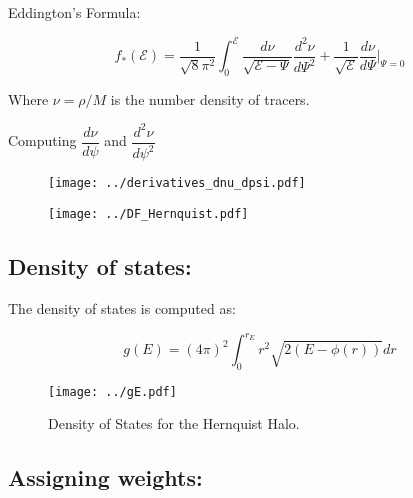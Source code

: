 \documentclass[14pt]{article}
\begin{document}
Eddington's Formula: 

\begin{equation}
  f_*(\mathcal{E}) = \dfrac{1}{\sqrt{8}\pi^2}\int_0^{\mathcal{E}} \dfrac{d
  \nu}{\sqrt{\mathcal{E}- \Psi}}  \dfrac{d^2 \nu}{d \Psi^2} +
  \dfrac{1}{\sqrt{\mathcal{E}}}\dfrac{d \nu}{d\Psi} \vert _{\Psi=0} 
\end{equation}

Where $\nu=\rho/M$ is the number density of tracers.

Computing $\dfrac{d \nu}{d \psi}$ and $\dfrac{d^2 \nu}{d \psi^2}$


\begin{figure}[H]
  \centering
  \texttt{[image: ../derivatives\_dnu\_dpsi.pdf]}
\end{figure}

\begin{figure}[H]
  \centering
  \texttt{[image: ../DF\_Hernquist.pdf]}
\end{figure}


\subsection{Density of states:}


The density of states is computed as:

\begin{equation}
  g(E) = (4\pi)^2 \int_0^{r_E} r^2 \sqrt{2(E - \phi(r))} dr
\end{equation}


\begin{figure}[H]
  \centering
  \texttt{[image: ../gE.pdf]}
  \caption{Density of States for the Hernquist Halo.}
\end{figure}

\subsection{Assigning weights:}
\end{document}

